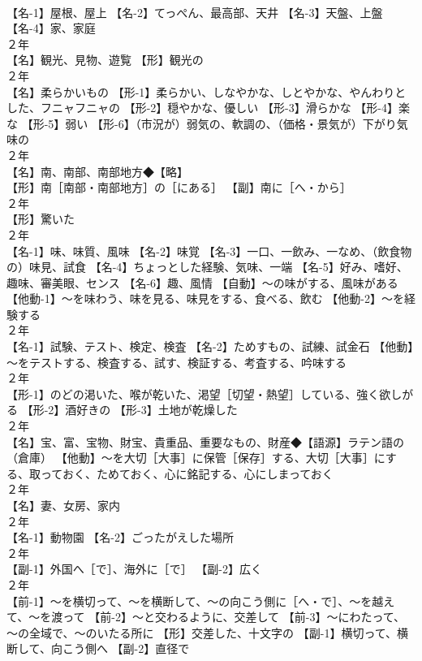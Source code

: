 \documentclass[8pt]{extreport}
\begin{document}
\begin{CJK}{UTF8}{min}
\\	【名-1】屋根、屋上 【名-2】てっぺん、最高部、天井 【名-3】天盤、上盤 【名-4】家、家庭
\\	２年	
\\	【名】観光、見物、遊覧 【形】観光の
\\	２年	
\\	【名】柔らかいもの 【形-1】柔らかい、しなやかな、しとやかな、やんわりとした、フニャフニャの 【形-2】穏やかな、優しい 【形-3】滑らかな 【形-4】楽な 【形-5】弱い 【形-6】（市況が）弱気の、軟調の、（価格・景気が）下がり気味の
\\	２年	
\\	【名】南、南部、南部地方◆【略】
\\	【形】南［南部・南部地方］の［にある］ 【副】南に［へ・から］
\\	２年	
\\	【形】驚いた
\\	２年	
\\	【名-1】味、味質、風味 【名-2】味覚 【名-3】一口、一飲み、一なめ、（飲食物の）味見、試食 【名-4】ちょっとした経験、気味、一端 【名-5】好み、嗜好、趣味、審美眼、センス 【名-6】趣、風情 【自動】～の味がする、風味がある 【他動-1】～を味わう、味を見る、味見をする、食べる、飲む 【他動-2】～を経験する
\\	２年	
\\	【名-1】試験、テスト、検定、検査 【名-2】ためすもの、試練、試金石 【他動】～をテストする、検査する、試す、検証する、考査する、吟味する
\\	２年	
\\	【形-1】のどの渇いた、喉が乾いた、渇望［切望・熱望］している、強く欲しがる 【形-2】酒好きの 【形-3】土地が乾燥した
\\	２年	
\\	【名】宝、富、宝物、財宝、貴重品、重要なもの、財産◆【語源】ラテン語の 
\\	（倉庫） 【他動】～を大切［大事］に保管［保存］する、大切［大事］にする、取っておく、ためておく、心に銘記する、心にしまっておく
\\	２年	
\\	【名】妻、女房、家内
\\	２年	
\\	【名-1】動物園 【名-2】ごったがえした場所
\\	２年	
\\	【副-1】外国へ［で］、海外に［で］ 【副-2】広く
\\	２年	
\\	【前-1】～を横切って、～を横断して、～の向こう側に［へ・で］、～を越えて、～を渡って 【前-2】～と交わるように、交差して 【前-3】～にわたって、～の全域で、～のいたる所に 【形】交差した、十文字の 【副-1】横切って、横断して、向こう側へ 【副-2】直径で

\end{CJK}
\end{document}

